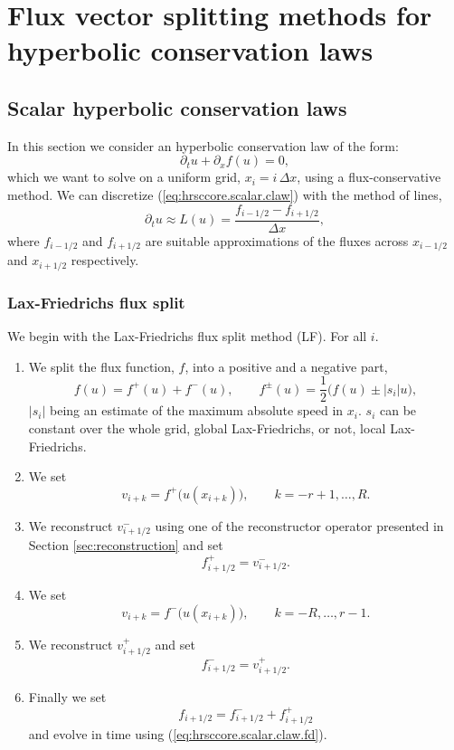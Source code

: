 \section{Flux vector splitting methods for hyperbolic conservation laws}

\subsection{Scalar hyperbolic conservation laws}
In this section we consider an hyperbolic conservation law of the form:
\begin{equation}\label{eq:hrsccore.scalar.claw}
  \partial_t u + \partial_x f(u) = 0,
\end{equation}
which we want to solve on a uniform grid, $x_i = i\, \Delta x$, using a
flux-conservative method. We can discretize (\ref{eq:hrsccore.scalar.claw}) with
the method of lines,
\begin{equation}\label{eq:hrsccore.scalar.claw.fd}
  \partial_t u \approx L(u) = \frac{f_{i-1/2}-f_{i+1/2}}{\Delta x},
\end{equation}
where $f_{i-1/2}$ and $f_{i+1/2}$ are suitable approximations of the fluxes
across $x_{i-1/2}$ and $x_{i+1/2}$ respectively.

\subsubsection{Lax-Friedrichs flux split}
We begin with the Lax-Friedrichs flux split method (LF). For all $i$.
\begin{enumerate}
  \item We split the flux function, $f$, into a positive and a negative part,
  \[
    f(u) = f^+(u) + f^-(u), \qquad f^\pm(u) = \frac{1}{2}\big(f(u) \pm | s_i |
    u\big),
  \]
  $|s_i|$ being an estimate of the maximum absolute speed in $x_i$. $s_i$ can be
  constant over the whole grid, global Lax-Friedrichs, or not, local
  Lax-Friedrichs.
  \item We set
  \[
    v_{i+k} = f^+\big(u(x_{i+k})\big), \qquad k = - r + 1, \ldots, R.
  \]
  \item We reconstruct $v_{i+1/2}^-$ using one of the reconstructor operator
  presented in Section \ref{sec:reconstruction} and set
  \[
    f_{i+1/2}^+ = v_{i+1/2}^-.
  \]
  \item We set
  \[
    v_{i+k} = f^-\big(u(x_{i+k})\big), \qquad k = -R, \ldots, r-1.
  \]
  \item We reconstruct $v_{i+1/2}^+$ and set
  \[
    f_{i+1/2}^- = v_{i+1/2}^+.
  \]
  \item Finally we set
  \[
    f_{i+1/2} = f_{i+1/2}^- + f_{i+1/2}^+
  \]
  and evolve in time using (\ref{eq:hrsccore.scalar.claw.fd}).
\end{enumerate}

